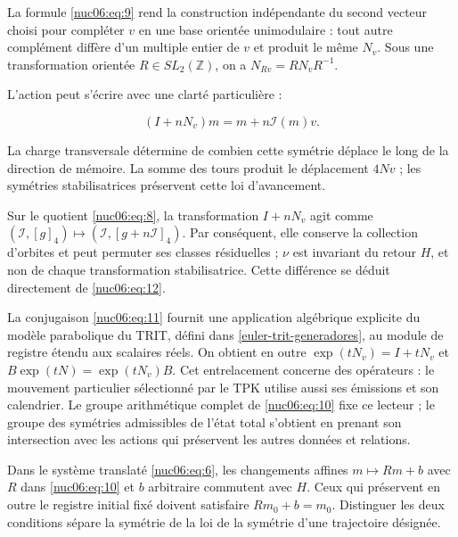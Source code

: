 La formule \eqref{nuc06:eq:9} rend la construction indépendante du second vecteur choisi pour compléter \(v\) en une base orientée unimodulaire : tout autre complément diffère d’un multiple entier de \(v\) et produit le même \(N_v\). Sous une transformation orientée \(R\in SL_2(\mathbb Z)\), on a \(N_{Rv}=RN_vR^{-1}\).

L’action peut s’écrire avec une clarté particulière :


\begin{equation}
(I+nN_v)m=m+n\mathcal I(m)v.
\label{nuc06:eq:12}
\end{equation}

La charge transversale détermine de combien cette symétrie déplace le long de la direction de mémoire. La somme des tours produit le déplacement \(4Nv\) ; les symétries stabilisatrices préservent cette loi d’avancement.

Sur le quotient \eqref{nuc06:eq:8}, la transformation \(I+nN_v\) agit comme \((\mathcal I,[g]_4)\mapsto(\mathcal I,[g+n\mathcal I]_4)\). Par conséquent, elle conserve la collection d’orbites et peut permuter ses classes résiduelles ; \(\nu\) est invariant du retour \(H\), et non de chaque transformation stabilisatrice. Cette différence se déduit directement de \eqref{nuc06:eq:12}.

La conjugaison \eqref{nuc06:eq:11} fournit une application algébrique explicite du modèle parabolique du TRIT, défini dans \cref{euler-trit-generadores}, au module de registre étendu aux scalaires réels. On obtient en outre \(\exp(tN_v)=I+tN_v\) et \(B\exp(tN)=\exp(tN_v)B\). Cet entrelacement concerne des opérateurs : le mouvement particulier sélectionné par le TPK utilise aussi ses émissions et son calendrier. Le groupe arithmétique complet de \eqref{nuc06:eq:10} fixe ce lecteur ; le groupe des symétries admissibles de l’état total s’obtient en prenant son intersection avec les actions qui préservent les autres données et relations.

Dans le système translaté \eqref{nuc06:eq:6}, les changements affines \(m\mapsto Rm+b\) avec \(R\) dans \eqref{nuc06:eq:10} et \(b\) arbitraire commutent avec \(H\). Ceux qui préservent en outre le registre initial fixé doivent satisfaire \(Rm_0+b=m_0\). Distinguer les deux conditions sépare la symétrie de la loi de la symétrie d’une trajectoire désignée.

